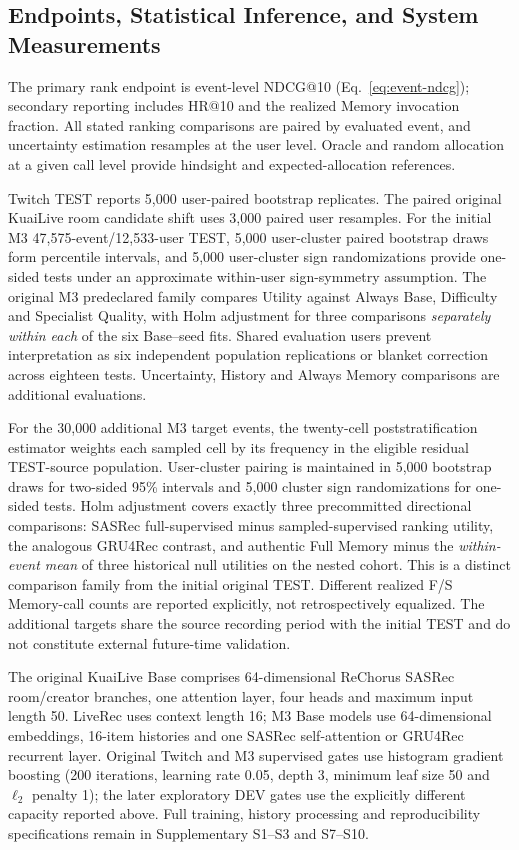 \subsection{Endpoints, Statistical Inference, and System Measurements}
\label{sec:exp-statistics}
\label{sec:exp-implementation}

The primary rank endpoint is event-level NDCG@10 (Eq.~\eqref{eq:event-ndcg}); secondary reporting includes HR@10 and the realized Memory invocation fraction. All stated ranking comparisons are paired by evaluated event, and uncertainty estimation resamples at the user level. Oracle and random allocation at a given call level provide hindsight and expected-allocation references.

Twitch TEST reports 5,000 user-paired bootstrap replicates. The paired original KuaiLive room candidate shift uses 3,000 paired user resamples. For the initial M3 47,575-event/12,533-user TEST, 5,000 user-cluster paired bootstrap draws form percentile intervals, and 5,000 user-cluster sign randomizations provide one-sided tests under an approximate within-user sign-symmetry assumption. The original M3 predeclared family compares Utility against Always Base, Difficulty and Specialist Quality, with Holm adjustment \cite{holm1979} for three comparisons \emph{separately within each} of the six Base--seed fits. Shared evaluation users prevent interpretation as six independent population replications or blanket correction across eighteen tests. Uncertainty, History and Always Memory comparisons are additional evaluations.

For the 30,000 additional M3 target events, the twenty-cell poststratification estimator weights each sampled cell by its frequency in the eligible residual TEST-source population. User-cluster pairing is maintained in 5,000 bootstrap draws for two-sided 95\% intervals and 5,000 cluster sign randomizations for one-sided tests. Holm adjustment covers exactly three precommitted directional comparisons: SASRec full-supervised minus sampled-supervised ranking utility, the analogous GRU4Rec contrast, and authentic Full Memory minus the \emph{within-event mean} of three historical null utilities on the nested cohort. This is a distinct comparison family from the initial original TEST. Different realized F/S Memory-call counts are reported explicitly, not retrospectively equalized. The additional targets share the source recording period with the initial TEST and do not constitute external future-time validation.

The original KuaiLive Base comprises 64-dimensional ReChorus SASRec room/creator branches, one attention layer, four heads and maximum input length 50. LiveRec uses context length 16; M3 Base models use 64-dimensional embeddings, 16-item histories and one SASRec self-attention or GRU4Rec recurrent layer. Original Twitch and M3 supervised gates use histogram gradient boosting (200 iterations, learning rate 0.05, depth 3, minimum leaf size 50 and $\ell_2$ penalty 1); the later exploratory DEV gates use the explicitly different capacity reported above. Full training, history processing and reproducibility specifications remain in Supplementary S1--S3 and S7--S10.

